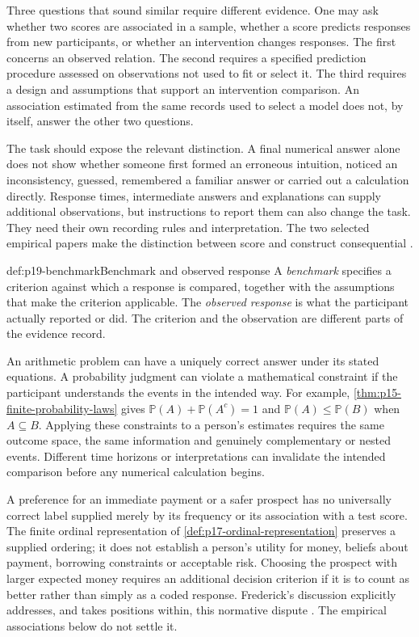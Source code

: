 Three questions that sound similar require different evidence. One may ask
whether two scores are associated in a sample, whether a score predicts
responses from new participants, or whether an intervention changes responses.
The first concerns an observed relation. The second requires a specified
prediction procedure assessed on observations not used to fit or select it.
The third requires a design and assumptions that support an intervention
comparison. An association estimated from the same records used to select a
model does not, by itself, answer the other two questions.

The task should expose the relevant distinction. A final numerical answer
alone does not show whether someone first formed an erroneous intuition,
noticed an inconsistency, guessed, remembered a familiar answer or carried out
a calculation directly. Response times, intermediate answers and explanations
can supply additional observations, but instructions to report them can also
change the task. They need their own recording rules and interpretation.
The two selected empirical papers make the distinction between score and
construct consequential \cite[pp.~26--28, 35]{Frederick2005CRT}
\cite[pp.~2--5, 12--14]{SinayevPeters2015Calculation}.

\begin{hbdefinition}{def:p19-benchmark}{Benchmark and observed response}
A \emph{benchmark} specifies a criterion against which a response is compared,
together with the assumptions that make the criterion applicable. The
\emph{observed response} is what the participant actually reported or did.
The criterion and the observation are different parts of the evidence record.
\end{hbdefinition}

An arithmetic problem can have a uniquely correct answer under its stated
equations. A probability judgment can violate a mathematical constraint if
the participant understands the events in the intended way. For example,
\cref{thm:p15-finite-probability-laws} gives
\(\mathbb P(A)+\mathbb P(A^c)=1\) and
\(\mathbb P(A)\leq\mathbb P(B)\) when \(A\subseteq B\).
Applying these constraints to a person's estimates requires the same outcome
space, the same information and genuinely complementary or nested events.
Different time horizons or interpretations can invalidate the intended
comparison before any numerical calculation begins.

A preference for an immediate payment or a safer prospect has no universally
correct label supplied merely by its frequency or its association with a test
score. The finite ordinal representation of
\cref{def:p17-ordinal-representation} preserves a supplied ordering; it does
not establish a person's utility for money, beliefs about payment, borrowing
constraints or acceptable risk. Choosing the prospect with larger expected
money requires an additional decision criterion if it is to count as better
rather than simply as a coded response. Frederick's discussion explicitly
addresses, and takes positions within, this normative dispute
\cite[pp.~38--41]{Frederick2005CRT}. The empirical associations below do not
settle it.

